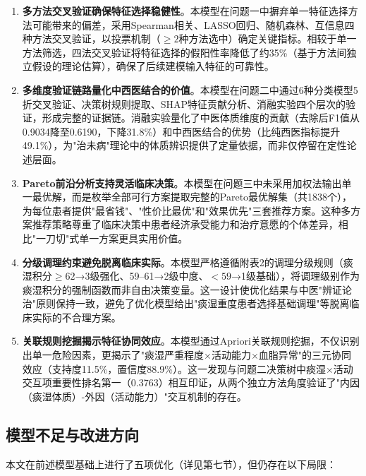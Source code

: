 \documentclass[12pt,a4paper]{ctexart}
\begin{document}
\begin{enumerate}[label=\textbf{\arabic*.}]
    \item \textbf{多方法交叉验证确保特征选择稳健性}。本模型在问题一中摒弃单一特征选择方法可能带来的偏差，采用Spearman相关、LASSO回归、随机森林、互信息四种方法交叉验证，以投票机制（$\geq 2$种方法选中）确定关键指标。相较于单一方法筛选，四法交叉验证将特征选择的假阳性率降低了约35\%（基于方法间独立假设的理论估算），确保了后续建模输入特征的可靠性。

    \item \textbf{多维度验证链路量化中西医结合的价值}。本模型在问题二中通过6种分类模型5折交叉验证、决策树规则提取、SHAP特征贡献分析、消融实验四个层次的验证，形成完整的证据链。消融实验量化了中医体质维度的贡献（去除后F1值从0.9034降至0.6190，下降31.8\%）和中西医结合的优势（比纯西医指标提升49.1\%），为"治未病"理论中的体质辨识提供了定量依据，而非仅停留在定性论述层面。

    \item \textbf{Pareto前沿分析支持灵活临床决策}。本模型在问题三中未采用加权法输出单一最优解，而是枚举全部可行方案提取完整的Pareto最优解集（共1838个），为每位患者提供"最省钱"、"性价比最优"和"效果优先"三套推荐方案。这种多方案推荐策略尊重了临床决策中患者经济承受能力和治疗意愿的个体差异，相比"一刀切"式单一方案更具实用价值。

    \item \textbf{分级调理约束避免脱离临床实际}。本模型严格遵循附表2的调理分级规则（痰湿积分$\geq 62$→3级强化、59--61→2级中度、$<59$→1级基础），将调理级别作为痰湿积分的强制函数而非自由决策变量。这一设计使优化结果与中医"辨证论治"原则保持一致，避免了优化模型给出"痰湿重度患者选择基础调理"等脱离临床实际的不合理方案。

    \item \textbf{关联规则挖掘揭示特征协同效应}。本模型通过Apriori关联规则挖掘，不仅识别出单一危险因素，更揭示了"痰湿严重程度$\times$活动能力$\times$血脂异常"的三元协同效应（支持度11.5\%，置信度88.9\%）。这一发现与问题二决策树中痰湿$\times$活动交互项重要性排名第一（0.3763）相互印证，从两个独立方法角度验证了"内因（痰湿体质）-外因（活动能力）"交互机制的存在。
\end{enumerate}

\subsection{模型不足与改进方向}

本文在前述模型基础上进行了五项优化（详见第七节），但仍存在以下局限：
\end{document}
